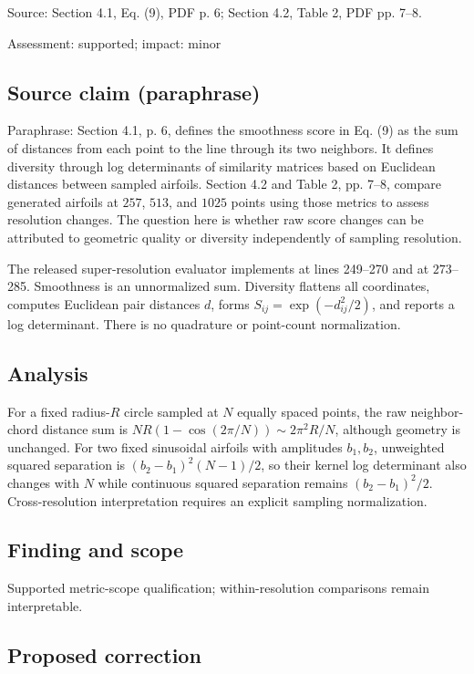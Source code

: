 \documentclass[11pt]{article}
\begin{document}
Source: Section 4.1, Eq. (9), PDF p. 6; Section 4.2, Table 2, PDF pp. 7–8.

Assessment: supported; impact: minor

\subsection*{Source claim (paraphrase)}

Paraphrase: Section 4.1, p. 6, defines the smoothness score in Eq. (9) as the sum of distances from each point to the line through its two neighbors. It defines diversity through log determinants of similarity matrices based on Euclidean distances between sampled airfoils. Section 4.2 and Table 2, pp. 7–8, compare generated airfoils at \(257\), \(513\), and \(1025\) points using those metrics to assess resolution changes. The question here is whether raw score changes can be attributed to geometric quality or diversity independently of sampling resolution.

The released super-resolution evaluator implements at lines 249–270 and at \(273\)–285. Smoothness is an unnormalized sum. Diversity flattens all coordinates, computes Euclidean pair distances \(d\), forms \(S_{ij}=\exp(-d_{ij}^2/2)\), and reports a log determinant. There is no quadrature or point-count normalization.

\subsection*{Analysis}

For a fixed radius-\(R\) circle sampled at \(N\) equally spaced points, the raw neighbor-chord distance sum is \(NR(1-\cos(2\pi/N))\sim2\pi^2R/N\), although geometry is unchanged. For two fixed sinusoidal airfoils with amplitudes \(b_1,b_2\), unweighted squared separation is \((b_2-b_1)^2(N-1)/2\), so their kernel log determinant also changes with \(N\) while continuous squared separation remains \((b_2-b_1)^2/2\). Cross-resolution interpretation requires an explicit sampling normalization.

\subsection*{Finding and scope}

Supported metric-scope qualification; within-resolution comparisons remain interpretable.

\subsection*{Proposed correction}
\end{document}
